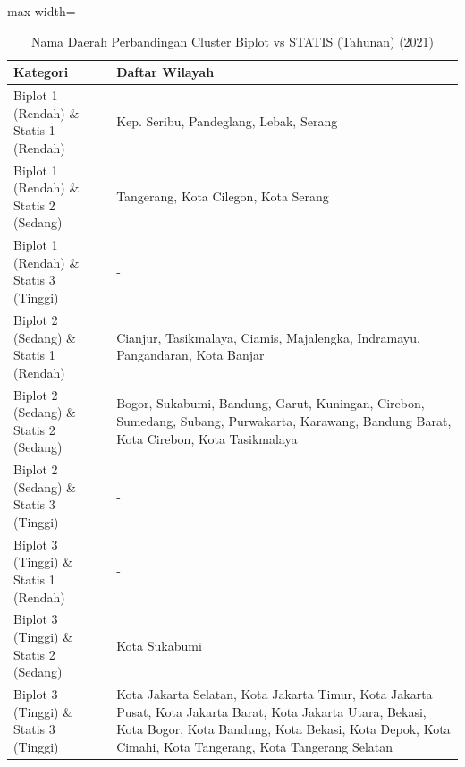 \begin{table}[H]
\centering
\caption{Nama Daerah Perbandingan Cluster Biplot vs STATIS (Tahunan) (2021)} \label{tab:app2biplot_statis_comp_name_2021}
\begin{adjustbox}{max width=\textwidth}
\begin{tabular}{|p{4cm}|p{10cm}|}
\hline
\textbf{Kategori} & \textbf{Daftar Wilayah} \\
\hline
Biplot 1 (Rendah) \& Statis 1 (Rendah) & Kep. Seribu, Pandeglang, Lebak, Serang \\
\hline
Biplot 1 (Rendah) \& Statis 2 (Sedang) & Tangerang, Kota Cilegon, Kota Serang \\
\hline
Biplot 1 (Rendah) \& Statis 3 (Tinggi) & - \\
\hline
Biplot 2 (Sedang) \& Statis 1 (Rendah) & Cianjur, Tasikmalaya, Ciamis, Majalengka, Indramayu, Pangandaran, Kota Banjar \\
\hline
Biplot 2 (Sedang) \& Statis 2 (Sedang) & Bogor, Sukabumi, Bandung, Garut, Kuningan, Cirebon, Sumedang, Subang, Purwakarta, Karawang, Bandung Barat, Kota Cirebon, Kota Tasikmalaya \\
\hline
Biplot 2 (Sedang) \& Statis 3 (Tinggi) & - \\
\hline
Biplot 3 (Tinggi) \& Statis 1 (Rendah) & - \\
\hline
Biplot 3 (Tinggi) \& Statis 2 (Sedang) & Kota Sukabumi \\
\hline
Biplot 3 (Tinggi) \& Statis 3 (Tinggi) & Kota Jakarta Selatan, Kota Jakarta Timur, Kota Jakarta Pusat, Kota Jakarta Barat, Kota Jakarta Utara, Bekasi, Kota Bogor, Kota Bandung, Kota Bekasi, Kota Depok, Kota Cimahi, Kota Tangerang, Kota Tangerang Selatan \\
\hline
\end{tabular}
\end{adjustbox}
\end{table}